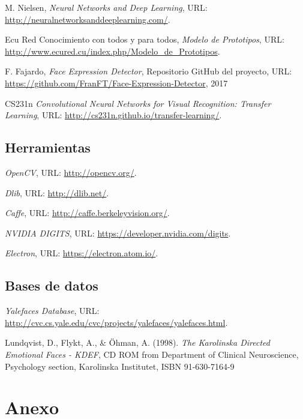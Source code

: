 \documentclass[a4paper,11pt]{book}
\begin{document}
\begin{thebibliography}{99}
	M. Nielsen,   
	\textit{Neural Networks and Deep Learning}, 
	URL: \url{http://neuralnetworksanddeeplearning.com/}.
	
	Ecu Red Conocimiento con todos y para todos,   
	\textit{Modelo de Prototipos}, 
	URL: \url{http://www.ecured.cu/index.php/Modelo_de_Prototipos}.
	
	F. Fajardo,   
	\textit{Face Expression Detector}, 
	Repositorio GitHub del proyecto, 
	URL: \url{https://github.com/FranFT/Face-Expression-Detector}, 
	2017
	
	CS231n  
	\textit{Convolutional Neural Networks for Visual Recognition: Transfer Learning}, 
	URL: \url{http://cs231n.github.io/transfer-learning/}.
	
	
	\section{Herramientas}
	\textit{OpenCV}, 
	URL: \url{http://opencv.org/}.
	
	\textit{Dlib}, 
	URL: \url{http://dlib.net/}.
	
	\textit{Caffe}, 
	URL: \url{http://caffe.berkeleyvision.org/}.
	
	\textit{NVIDIA DIGITS}, 
	URL: \url{https://developer.nvidia.com/digits}.
	
	\textit{Electron}, 
	URL: \url{https://electron.atom.io/}.
	
	\section{Bases de datos}
	\textit{Yalefaces Database}, 
	URL: \url{	http://cvc.cs.yale.edu/cvc/projects/yalefaces/yalefaces.html}.
	
	Lundqvist, D., Flykt, A., \& Öhman, A. (1998). %
	\textit{The Karolinska Directed Emotional Faces - KDEF}, %
	CD ROM from Department of Clinical Neuroscience, Psychology section, Karolinska Institutet, ISBN 91-630-7164-9
	
	

	
\end{thebibliography}
\chapter{Anexo}
\end{document}
